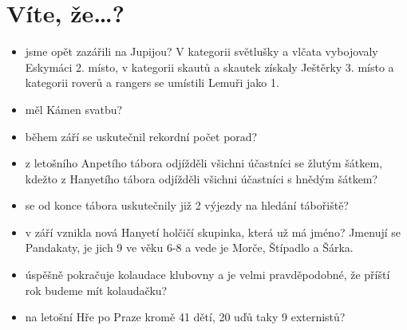 \chapter{Víte, že…?} %
\label{cha:vite}
	
\begin{itemize}
	\item jsme opět zazářili na Jupijou? V kategorii světlušky a vlčata vybojovaly Eskymáci 2. místo, v kategorii skautů a skautek získaly Ještěrky 3. místo a kategorii roverů a rangers se umístili Lemuři jako 1.

	\item měl Kámen svatbu?
	\item během září se uskutečnil rekordní počet porad?
	\item z letošního Anpetího tábora odjížděli všichni účastníci se žlutým šátkem, kdežto z Hanyetího tábora odjížděli všichni účastníci s hnědým šátkem?
	\item se od konce tábora uskutečnily již 2 výjezdy na hledání tábořiště?
	\item v září vznikla nová Hanyetí holčičí skupinka, která už má jméno? Jmenují se Pandakaty, je jich 9 ve věku 6-8 a vede je Morče, Štípadlo a Šárka.
	\item úspěšně pokračuje kolaudace klubovny a je velmi pravděpodobné, že příští rok budeme mít kolaudačku?
	\item na letošní Hře po Praze kromě 41 dětí, 20 uďů taky 9 externistů?

\end{itemize}

\clearpage